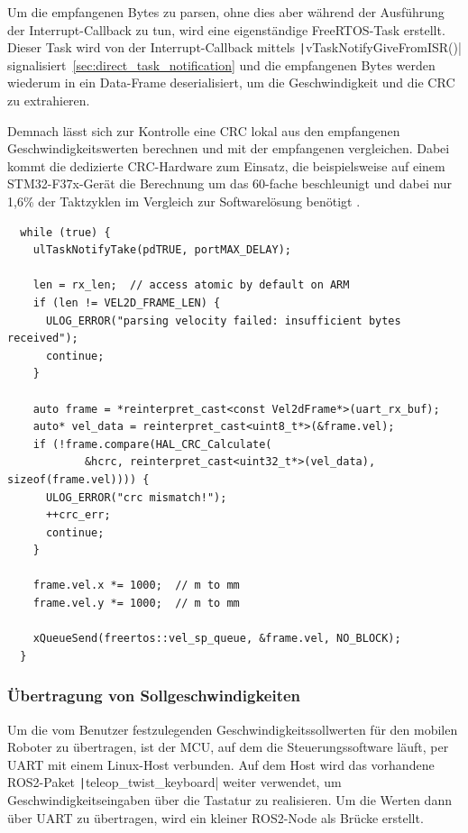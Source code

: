 Um die empfangenen Bytes zu parsen, ohne dies aber während der Ausführung der
Interrupt-Callback zu tun, wird eine eigenständige FreeRTOS-Task erstellt.
Dieser Task wird von der Interrupt-Callback mittels
\texttt|vTaskNotifyGiveFromISR()|
signalisiert~\ref{sec:direct_task_notification} und die empfangenen Bytes werden
wiederum in ein Data-Frame deserialisiert, um die Geschwindigkeit und die CRC zu
extrahieren.

Demnach lässt sich zur Kontrolle eine CRC lokal aus den empfangenen
Geschwindigkeitswerten berechnen und mit der empfangenen vergleichen. Dabei
kommt die dedizierte CRC-Hardware zum Einsatz, die beispielsweise auf einem
STM32-F37x-Gerät die Berechnung um das 60-fache beschleunigt und dabei nur 1,6\%
der Taktzyklen im Vergleich zur Softwarelösung benötigt \cite[S. 9]{AN4187}.

\begin{code}
\begin{verbatim}
  while (true) {
    ulTaskNotifyTake(pdTRUE, portMAX_DELAY);

    len = rx_len;  // access atomic by default on ARM
    if (len != VEL2D_FRAME_LEN) {
      ULOG_ERROR("parsing velocity failed: insufficient bytes received");
      continue;
    }

    auto frame = *reinterpret_cast<const Vel2dFrame*>(uart_rx_buf);
    auto* vel_data = reinterpret_cast<uint8_t*>(&frame.vel);
    if (!frame.compare(HAL_CRC_Calculate(
            &hcrc, reinterpret_cast<uint32_t*>(vel_data), sizeof(frame.vel)))) {
      ULOG_ERROR("crc mismatch!");
      ++crc_err;
      continue;
    }

    frame.vel.x *= 1000;  // m to mm
    frame.vel.y *= 1000;  // m to mm

    xQueueSend(freertos::vel_sp_queue, &frame.vel, NO_BLOCK);
  }
\end{verbatim}
\end{code}

\subsubsection{Übertragung von Sollgeschwindigkeiten}

Um die vom Benutzer festzulegenden Geschwindigkeitssollwerten für den mobilen
Roboter zu übertragen, ist der MCU, auf dem die Steuerungssoftware
läuft, per UART mit einem Linux-Host verbunden. Auf dem Host wird das vorhandene
ROS2-Paket \texttt|teleop_twist_keyboard| weiter verwendet, um
Geschwindigkeitseingaben über die Tastatur zu realisieren. Um die Werten dann
über UART zu übertragen, wird ein kleiner ROS2-Node als Brücke erstellt.

